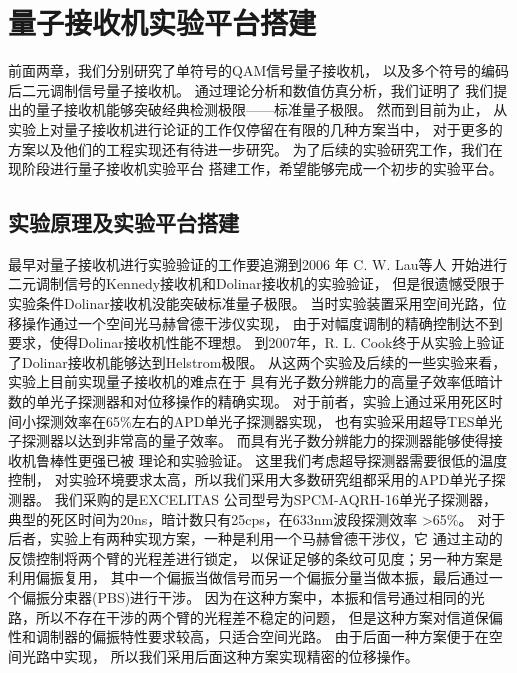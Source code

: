 \chapter{量子接收机实验平台搭建}
前面两章，我们分别研究了单符号的QAM信号量子接收机，
以及多个符号的编码后二元调制信号量子接收机。
通过理论分析和数值仿真分析，我们证明了
我们提出的量子接收机能够突破经典检测极限——标准量子极限。
然而到目前为止，
从实验上对量子接收机进行论证的工作仅停留在有限的几种方案当中，
对于更多的方案以及他们的工程实现还有待进一步研究。
为了后续的实验研究工作，我们在现阶段进行量子接收机实验平台
搭建工作，希望能够完成一个初步的实验平台。


\section{实验原理及实验平台搭建}
最早对量子接收机进行实验验证的工作要追溯到2006 年 C. W. Lau等人
开始进行二元调制信号的Kennedy接收机和Dolinar接收机的实验验证\cite{lau2006binary}，
但是很遗憾受限于实验条件Dolinar接收机没能突破标准量子极限。
当时实验装置采用空间光路，位移操作通过一个空间光马赫曾德干涉仪实现，
由于对幅度调制的精确控制达不到要求，使得Dolinar接收机性能不理想。
到2007年，R. L. Cook终于从实验上验证了Dolinar接收机能够达到Helstrom极限\cite{cook2007optical}。
从这两个实验及后续的一些实验来看\cite{wittmann2008demonstration,wittmann2010demonstration,tsujino2010sub,
tsujino2011quantum,becerra2011m,chen2012optical,muller2012quadrature,becerra2013experimental,
becerra2015photon}，
实验上目前实现量子接收机的难点在于
具有光子数分辨能力的高量子效率低暗计数的单光子探测器和对位移操作的精确实现。
对于前者，实验上通过采用死区时间小探测效率在65\%左右的APD单光子探测器实现，
也有实验采用超导TES单光子探测器以达到非常高的量子效率\cite{tsujino2011quantum}。
而具有光子数分辨能力的探测器能够使得接收机鲁棒性更强已被
理论和实验验证\cite{izumi2013quantum,li2013suppressing,becerra2015photon}。
这里我们考虑超导探测器需要很低的温度控制，
对实验环境要求太高，所以我们采用大多数研究组都采用的APD单光子探测器。
我们采购的是EXCELITAS 公司型号为SPCM-AQRH-16单光子探测器，
典型的死区时间为20ns，暗计数只有25cps，在633nm波段探测效率
>65\%。
对于后者，实验上有两种实现方案，一种是利用一个马赫曾德干涉仪，它
通过主动的反馈控制将两个臂的光程差进行锁定，
以保证足够的条纹可见度\cite{becerra2013experimental,
becerra2015photon}；另一种方案是利用偏振复用，
其中一个偏振当做信号而另一个偏振分量当做本振，最后通过一个偏振分束器(PBS)进行干涉\cite{wittmann2008demonstration,wittmann2010demonstration}。
因为在这种方案中，本振和信号通过相同的光路，所以不存在干涉的两个臂的光程差不稳定的问题，
但是这种方案对信道保偏性和调制器的偏振特性要求较高，只适合空间光路。
由于后面一种方案便于在空间光路中实现，
所以我们采用后面这种方案实现精密的位移操作。


